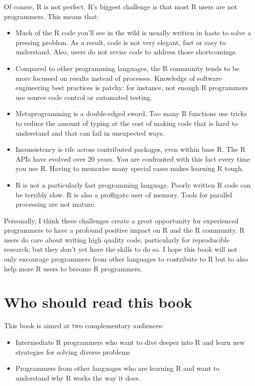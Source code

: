 Of course, R is not perfect. R's biggest challenge is that most R users
are not programmers. This means that:

\begin{itemize}
\item
  Much of the R code you'll see in the wild is usually written in haste
  to solve a pressing problem. As a result, code is not very elegant,
  fast or easy to understand. Also, users do not revise code to address
  those shortcomings.
\item
  Compared to other programming languages, the R community tends to be
  more focussed on results instead of processes. Knowledge of software
  engineering best practices is patchy: for instance, not enough R
  programmers use source code control or automated testing.
\item
  Metaprogramming is a double-edged sword. Too many R functions use
  tricks to reduce the amount of typing at the cost of making code that
  is hard to understand and that can fail in unexpected ways.
\item
  Inconsistency is rife across contributed packages, even within base R.
  The R APIs have evolved over 20 years. You are confronted with this
  fact every time you use R. Having to memorise many special cases makes
  learning R tough.
\item
  R is not a particularly fast programming language. Poorly written R
  code can be terribly slow. R is also a profligate user of memory.
  Tools for parallel processing are not mature.
\end{itemize}

Personally, I think these challenges create a great opportunity for
experienced programmers to have a profound positive impact on R and the
R community. R users do care about writing high quality code,
particularly for reproducible research, but they don't yet have the
skills to do so. I hope this book will not only encourage programmers
from other languages to contribute to R but to also help more R users to
become R programmers.

\section{Who should read this book}\label{who-should-read-this-book}

This book is aimed at two complementary audiences:

\begin{itemize}
\item
  Intermediate R programmers who want to dive deeper into R and learn
  new strategies for solving diverse problems
\item
  Programmers from other languages who are learning R and want to
  understand why R works the way it does.
\end{itemize}

